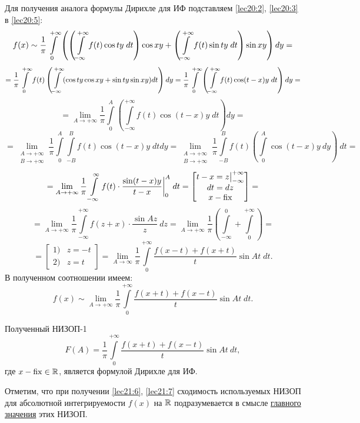 \documentclass[../../main.tex]{subfiles}
\begin{document}
Для получения аналога формулы Дирихле для ИФ подставляем
\eqref{lec20:2}, \eqref{lec20:3} в \eqref{lec20:5}:
\[
f(x) \sim \dfrac{1}{\pi} \int\limits_{0}^{+\infty}
\left(
\left(\int\limits_{-\infty}^{+\infty} f(t) \cos ty\;dt\right) \cos xy +
\left(
\int\limits_{-\infty}^{+\infty} f(t) \sin ty\;dt
\right) \sin xy 
\right) dy = \] \[ =
\dfrac{1}{\pi}
\int\limits_{0}^{+\infty} f(t) \left(
\int\limits_{-\infty}^{+\infty} (\cos ty\cos xy + \sin ty\sin xy) dt
\right) dy =
\dfrac{1}{\pi} \int\limits_{0}^{+\infty} \left(
\int\limits_{-\infty}^{+\infty} f(t) \cos(t - x)y\;dt
\right) dy = \] \[ =
\lim\limits_{A \to +\infty} \dfrac{1}{\pi}
\int\limits_0^{A} \left(
\int\limits_{-\infty}^{+\infty}
f(t) \cos(t - x)y\;dt
\right) dy =
\] \[ = 
\lim\limits_{\substack{A \to +\infty \\ B \to +\infty}} \dfrac{1}{\pi}
\int\limits_0^A \int\limits_{-B}^B f(t) \cos(t-x)y\;dtdy =
\lim\limits_{\substack{A \to +\infty \\ B \to +\infty}}
\dfrac{1}{\pi} \int\limits_{-B}^B f(t) \left(
\int\limits_0^A
 \cos (t - x) y\ dy \right)\ dt =
\] \[ = 
\lim\limits_{A \to +\infty} \dfrac{1}{\pi}
\int\limits_{-\infty}^{\infty} f(t) \cdot
\dfrac{\sin (t - x)y}{t - x}\bigg|_0^A\;dt = 
\begin{bmatrix}
t - x = z \big|_{-\infty}^{+\infty}\\
dt = dz \\
x - \operatorname{fix}
\end{bmatrix} =
\] \[ = 
\lim\limits_{A \to +\infty} \dfrac{1}{\pi} 
\int\limits_{-\infty}^{+\infty} f(z + x)\cdot
\dfrac{\sin Az}{z}\ dz =
\lim\limits_{A \to +\infty} \dfrac{1}{\pi}
\left(
\int\limits_{-\infty}^{0} + 
\int\limits_{0}^{+\infty}
\right) =
\] \[ = 
\begin{bmatrix}
1)& z = -t \\
2)& z = t
\end{bmatrix} =
\lim\limits_{A \to \infty} \dfrac{1}{\pi}
\int\limits_{0}^{+\infty}
\dfrac{f(x - t) + f(x + t)}{t} \sin At\;dt.
\]
В полученном соотношении имеем:
\begin{equation}
\label{lec21:6}
	f(x) \sim \lim\limits_{A \to +\infty} \dfrac{1}{\pi} 
	\int\limits_0^{+\infty} \dfrac{f(x + t) + f(x - t)}{t} \sin At\;dt.
\end{equation}

Полученный НИЗОП-1
\begin{equation}
\label{lec21:7}
	F(A) = \dfrac{1}{\pi} \int\limits_0^{+\infty} 
	\dfrac{f(x + t) + f(x - t)}{t} \sin At\ dt,
\end{equation}
где $ x - \operatorname{fix} \in \mathbb{R} $, является формулой Дирихле для ИФ.

Отметим, что при получении \eqref{lec21:6}, \eqref{lec21:7}
сходимость используемых НИЗОП для абсолютной интегрируемости $f(x)$ на
$\mathbb{R}$ подразумевается в смысле \underline{главного значения} этих НИЗОП.
\end{document}
